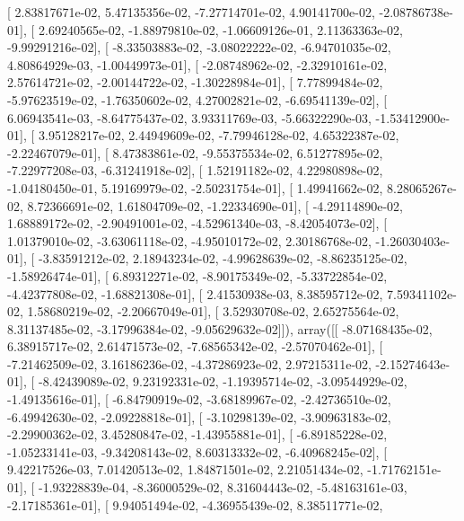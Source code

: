 \documentclass{article}
\begin{document}
       [  2.83817671e-02,   5.47135356e-02,  -7.27714701e-02,
          4.90141700e-02,  -2.08786738e-01],
       [  2.69240565e-02,  -1.88979810e-02,  -1.06609126e-01,
          2.11363363e-02,  -9.99291216e-02],
       [ -8.33503883e-02,  -3.08022222e-02,  -6.94701035e-02,
          4.80864929e-03,  -1.00449973e-01],
       [ -2.08748962e-02,  -2.32910161e-02,   2.57614721e-02,
         -2.00144722e-02,  -1.30228984e-01],
       [  7.77899484e-02,  -5.97623519e-02,  -1.76350602e-02,
          4.27002821e-02,  -6.69541139e-02],
       [  6.06943541e-03,  -8.64775437e-02,   3.93311769e-03,
         -5.66322290e-03,  -1.53412900e-01],
       [  3.95128217e-02,   2.44949609e-02,  -7.79946128e-02,
          4.65322387e-02,  -2.22467079e-01],
       [  8.47383861e-02,  -9.55375534e-02,   6.51277895e-02,
         -7.22977208e-03,  -6.31241918e-02],
       [  1.52191182e-02,   4.22980898e-02,  -1.04180450e-01,
          5.19169979e-02,  -2.50231754e-01],
       [  1.49941662e-02,   8.28065267e-02,   8.72366691e-02,
          1.61804709e-02,  -1.22334690e-01],
       [ -4.29114890e-02,   1.68889172e-02,  -2.90491001e-02,
         -4.52961340e-03,  -8.42054073e-02],
       [  1.01379010e-02,  -3.63061118e-02,  -4.95010172e-02,
          2.30186768e-02,  -1.26030403e-01],
       [ -3.83591212e-02,   2.18943234e-02,  -4.99628639e-02,
         -8.86235125e-02,  -1.58926474e-01],
       [  6.89312271e-02,  -8.90175349e-02,  -5.33722854e-02,
         -4.42377808e-02,  -1.68821308e-01],
       [  2.41530938e-03,   8.38595712e-02,   7.59341102e-02,
          1.58680219e-02,  -2.20667049e-01],
       [  3.52930708e-02,   2.65275564e-02,   8.31137485e-02,
         -3.17996384e-02,  -9.05629632e-02]]), array([[ -8.07168435e-02,   6.38915717e-02,   2.61471573e-02,
         -7.68565342e-02,  -2.57070462e-01],
       [ -7.21462509e-02,   3.16186236e-02,  -4.37286923e-02,
          2.97215311e-02,  -2.15274643e-01],
       [ -8.42439089e-02,   9.23192331e-02,  -1.19395714e-02,
         -3.09544929e-02,  -1.49135616e-01],
       [ -6.84790919e-02,  -3.68189967e-02,  -2.42736510e-02,
         -6.49942630e-02,  -2.09228818e-01],
       [ -3.10298139e-02,  -3.90963183e-02,  -2.29900362e-02,
          3.45280847e-02,  -1.43955881e-01],
       [ -6.89185228e-02,  -1.05233141e-03,  -9.34208143e-02,
          8.60313332e-02,  -6.40968245e-02],
       [  9.42217526e-03,   7.01420513e-02,   1.84871501e-02,
          2.21051434e-02,  -1.71762151e-01],
       [ -1.93228839e-04,  -8.36000529e-02,   8.31604443e-02,
         -5.48163161e-03,  -2.17185361e-01],
       [  9.94051494e-02,  -4.36955439e-02,   8.38511771e-02,
\end{document}
